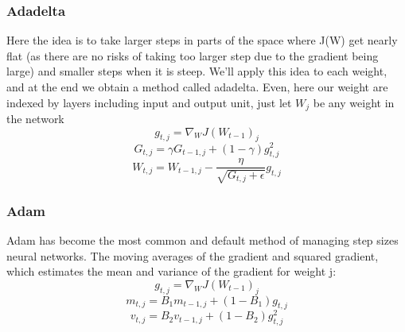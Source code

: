 \subsubsection{Adadelta}
Here the idea is to take larger steps in parts of the space where J(W) get nearly flat (as there are no risks of taking too larger step due to the gradient being large) and smaller steps when it is steep. We’ll apply this idea to each weight, and at the end we obtain a method called adadelta. 
Even, here our weight are indexed by layers including input and output unit, just let $W_j$ be any weight in the network\\
\begin{equation*}
    g_{t,j} = \nabla_W J (W_{t-1})_j
\end{equation*}
\begin{equation*}
       G_{t,j }= \gamma G_{t-1, j} + (1-\gamma) g_{t,j}^2
\end{equation*}
\begin{equation*}
    W_{t,j} = W_{t-1,j}- \frac{\eta}{\sqrt{G_{t,j}+\epsilon}}g_{t,j}
\end{equation*}

\subsubsection{Adam}

Adam has become the most common and default method of managing step sizes neural networks. The moving averages of the gradient
and squared gradient, which estimates the mean and variance of the gradient for weight j:
\begin{equation*}
     g_{t,j} = \nabla_W J (W_{t-1})_j
\end{equation*}
\begin{equation*}
        m_{t,j} = B_1 m_{t-1,j} + (1-B_1) g_{t,j}
\end{equation*}
\begin{equation*}
        v_{t,j} = B_2 v_{t-1,j} + (1-B_2) g_{t,j}^2
\end{equation*}

